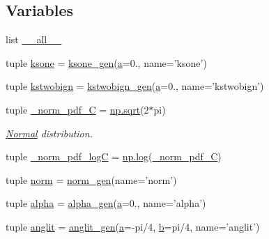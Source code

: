 \subsection*{Variables}
\begin{DoxyCompactItemize}
\item 
list \hyperlink{namespacescipy_1_1stats_1_1__continuous__distns_ac8928f4e05d766e795f8022a29c951d9}{\+\_\+\+\_\+all\+\_\+\+\_\+}
\item 
tuple \hyperlink{namespacescipy_1_1stats_1_1__continuous__distns_a114561f62477d16480daaa93b7b8bc98}{ksone} = \hyperlink{classscipy_1_1stats_1_1__continuous__distns_1_1ksone__gen}{ksone\+\_\+gen}(\hyperlink{gen__mat5files_8m_aae328bf20413f220e38aec4d95bfd6da}{a}=0., name='ksone')
\item 
tuple \hyperlink{namespacescipy_1_1stats_1_1__continuous__distns_a9b744d4d67420949d800d54e4f61534d}{kstwobign} = \hyperlink{classscipy_1_1stats_1_1__continuous__distns_1_1kstwobign__gen}{kstwobign\+\_\+gen}(\hyperlink{gen__mat5files_8m_aae328bf20413f220e38aec4d95bfd6da}{a}=0., name='kstwobign')
\item 
tuple \hyperlink{namespacescipy_1_1stats_1_1__continuous__distns_ae8c358a332576d79dfde21f1f3b24b6e}{\+\_\+norm\+\_\+pdf\+\_\+\+C} = \hyperlink{vecuops_8cc_ac9f82fdb8cd289615247f897852ee5f2}{np.\+sqrt}(2$\ast$pi)
\begin{DoxyCompactList}\small\item\em \hyperlink{classNormal}{Normal} distribution. \end{DoxyCompactList}\item 
tuple \hyperlink{namespacescipy_1_1stats_1_1__continuous__distns_ad05ebf13d9bf973492d6a8e181444c94}{\+\_\+norm\+\_\+pdf\+\_\+log\+C} = \hyperlink{vecuops_8cc_a9744da94c7846c49ff48444fde8d765f}{np.\+log}(\hyperlink{namespacescipy_1_1stats_1_1__continuous__distns_ae8c358a332576d79dfde21f1f3b24b6e}{\+\_\+norm\+\_\+pdf\+\_\+\+C})
\item 
tuple \hyperlink{namespacescipy_1_1stats_1_1__continuous__distns_a8c50faae73ca641fd8675adf39b1aefd}{norm} = \hyperlink{classscipy_1_1stats_1_1__continuous__distns_1_1norm__gen}{norm\+\_\+gen}(name='norm')
\item 
tuple \hyperlink{namespacescipy_1_1stats_1_1__continuous__distns_a7f01ce8f4f0a8f0106591aa4ff8dd4ba}{alpha} = \hyperlink{classscipy_1_1stats_1_1__continuous__distns_1_1alpha__gen}{alpha\+\_\+gen}(\hyperlink{gen__mat5files_8m_aae328bf20413f220e38aec4d95bfd6da}{a}=0., name='alpha')
\item 
tuple \hyperlink{namespacescipy_1_1stats_1_1__continuous__distns_afd8d30b213ef7128dbe042ac333feb94}{anglit} = \hyperlink{classscipy_1_1stats_1_1__continuous__distns_1_1anglit__gen}{anglit\+\_\+gen}(\hyperlink{gen__mat5files_8m_aae328bf20413f220e38aec4d95bfd6da}{a}=-\/pi/4, \hyperlink{gen__mat5files_8m_a7b38767b3b6a8dae167e5afa4fc340b0}{b}=pi/4, name='anglit')

\end{DoxyCompactItemize}
